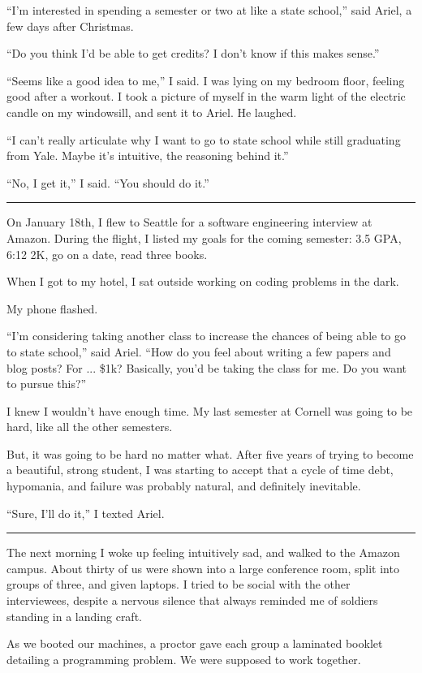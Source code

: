 ``I'm interested in spending a semester or two at like a state school,'' said
Ariel, a few days after Christmas.  

``Do you think I'd be able to get credits?  I don't know if this makes sense.''

``Seems like a good idea to me,'' I said.  I was lying on my bedroom floor,
feeling good after a workout.  I took a picture of myself in the warm light of
the electric candle on my windowsill, and sent it to Ariel.  He laughed.

 ``I can't really articulate why I want to go to state school while still
graduating from Yale.  Maybe it's intuitive, the reasoning behind it.'' 

``No, I get it,'' I said. ``You should do it.''

\plainfancybreak{12pt}{2}{}

On January 18th, I flew to Seattle for a software engineering interview at
Amazon.  During the flight, I listed my goals for the coming semester: 3.5 GPA,
6:12 2K, go on a date, read three books.  

When I got to my hotel, I sat outside working on coding problems in the dark.

My phone flashed.

``I'm considering taking another class to increase the chances of being able to
go to state school,'' said Ariel.  ``How do you feel about writing a few papers
and blog posts?  For ... \$1k?  Basically, you'd be taking the class for me.  Do
you want to pursue this?'' 

I knew I wouldn't have enough time.  My last semester at Cornell was going to be
hard, like all the other semesters. 

But, it was going to be hard no matter what.  After five years of trying to
become a beautiful, strong student, I was starting to accept that a cycle of
time debt, hypomania, and failure was probably natural, and definitely
inevitable. 

``Sure, I'll do it,'' I texted Ariel.

\plainfancybreak{12pt}{2}{}

The next morning I woke up feeling intuitively sad, and walked to the Amazon
campus.  About thirty of us were shown into a large conference room, split into
groups of three, and given laptops.  I tried to be social with the other
interviewees, despite a nervous silence that always reminded me of soldiers
standing in a landing craft.

As we booted our machines, a proctor gave each group a laminated booklet
detailing a programming problem.  We were supposed to work together.

